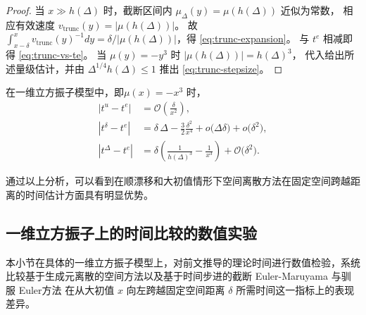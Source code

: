 \begin{proof}
	当 \(x\gg h(\Delta)\) 时，截断区间内 \(\mu_{\Delta}(y)=\mu(h(\Delta))\) 近似为常数，
	相应有效速度 \(v_{\mathrm{trunc}}(y)=\lvert\mu(h(\Delta))\rvert\)。
	故 \(\int_{x-\delta}^{x} v_{\mathrm{trunc}}(y)^{-1}dy=\delta/\lvert \mu(h(\Delta))\rvert\)，得 \eqref{eq:trunc-expansion}。
	与 \(t^{e}\) 相减即得 \eqref{eq:trunc-vs-te}。
	当 \(\mu(y)=-y^{3}\) 时
	\(\lvert\mu(h(\Delta))\rvert=h(\Delta)^{3}\)，
	代入给出所述量级估计，并由 \(\Delta^{1/4}h(\Delta)\le1\) 推出 \eqref{eq:trunc-stepsize}。
\end{proof}

在一维立方振子模型中，即\(\mu(x)=-x^{3}\) 时，
\begin{align*}
	|t^u - t^e|
	&=\mathcal{O\!} \left(\frac{\delta}{x^2}\right),\\
	|t^{\delta}-t^{e}|
	&=\delta\,\Delta-\frac{3}{2}\frac{\delta^{2}}{x^{4}}
	+o\!\big(\Delta\delta\big)+o\!\big(\delta^{2}\big),\\
	|t^{\Delta}-t^{e}|
	&=\delta\!\left(\frac{1}{h(\Delta)^{3}}-\frac{1}{x^{3}}\right)
	+\mathcal O\!\big(\delta^{2}\big).
\end{align*}

通过以上分析，可以看到在顺漂移和大初值情形下空间离散方法在固定空间跨越距离的时间估计方面具有明显优势。






\subsection{一维立方振子上的时间比较的数值实验}\label{subsec:cubic-numerics}

本小节在具体的一维立方振子模型上，对前文推导的理论时间进行数值检验，系统比较基于生成元离散的空间方法以及基于时间步进的截断 Euler-Maruyama 与驯服 Euler方法
在从大初值 \(x\) 向左跨越固定空间距离 \(\delta\) 所需时间这一指标上的表现差异。

